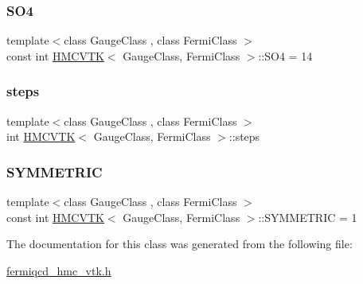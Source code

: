 \mbox{\label{class_h_m_c_v_t_k_a742969bcc172c8de8bd0b9b7968569dd}} 
\subsubsection{\texorpdfstring{S\+O4}{SO4}}
{\footnotesize\ttfamily template$<$class Gauge\+Class , class Fermi\+Class $>$ \\
const int \hyperlink{class_h_m_c_v_t_k}{H\+M\+C\+V\+TK}$<$ Gauge\+Class, Fermi\+Class $>$\+::S\+O4 = 14\hspace{0.3cm}{\ttfamily [static]}}

\mbox{\label{class_h_m_c_v_t_k_ac8beb987b81e5cb2d1efac1c972f7da5}} 
\subsubsection{\texorpdfstring{steps}{steps}}
{\footnotesize\ttfamily template$<$class Gauge\+Class , class Fermi\+Class $>$ \\
int \hyperlink{class_h_m_c_v_t_k}{H\+M\+C\+V\+TK}$<$ Gauge\+Class, Fermi\+Class $>$\+::steps}

\mbox{\label{class_h_m_c_v_t_k_a6e113bbf213d3912e17705edaad6abdc}} 
\subsubsection{\texorpdfstring{S\+Y\+M\+M\+E\+T\+R\+IC}{SYMMETRIC}}
{\footnotesize\ttfamily template$<$class Gauge\+Class , class Fermi\+Class $>$ \\
const int \hyperlink{class_h_m_c_v_t_k}{H\+M\+C\+V\+TK}$<$ Gauge\+Class, Fermi\+Class $>$\+::S\+Y\+M\+M\+E\+T\+R\+IC = 1\hspace{0.3cm}{\ttfamily [static]}}



The documentation for this class was generated from the following file\+:\begin{DoxyCompactItemize}
\item 
\hyperlink{fermiqcd__hmc__vtk_8h}{fermiqcd\+\_\+hmc\+\_\+vtk.\+h}\end{DoxyCompactItemize}
